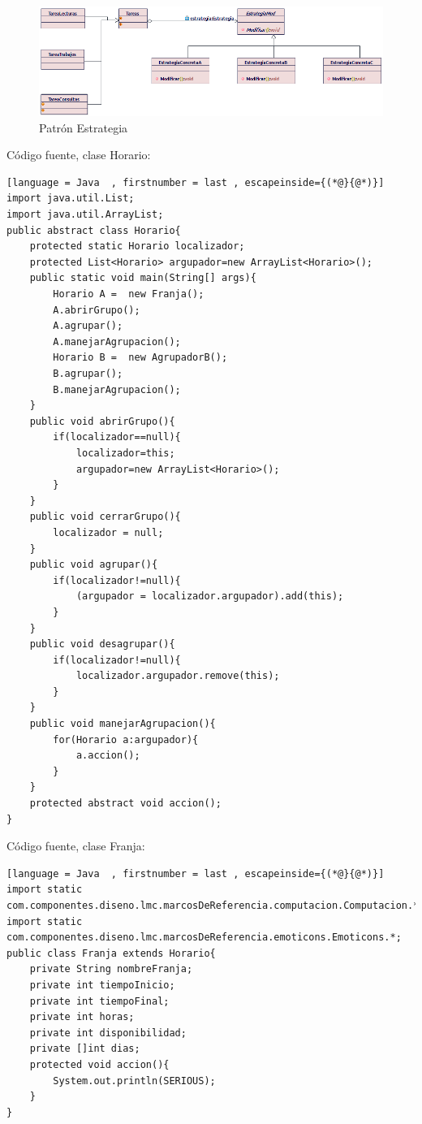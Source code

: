 \begin{figure}[H]
	\centering
	\includegraphics[width=1\linewidth]{diseno/patrones/imgs/Estrategia}
	\caption{Patrón Estrategia}
	\label{fig:gantt}
\end{figure}

Código fuente, clase Horario:

\begin{lstlisting}[language = Java  , firstnumber = last , escapeinside={(*@}{@*)}]
import java.util.List;
import java.util.ArrayList;
public abstract class Horario{
	protected static Horario localizador;
	protected List<Horario> argupador=new ArrayList<Horario>();
	public static void main(String[] args){
		Horario A =  new Franja();
		A.abrirGrupo();
		A.agrupar();
		A.manejarAgrupacion();
		Horario B =  new AgrupadorB();
		B.agrupar();
		B.manejarAgrupacion();
	}
	public void abrirGrupo(){
		if(localizador==null){
   			localizador=this;
   			argupador=new ArrayList<Horario>();
   		}
	}
	public void cerrarGrupo(){
		localizador = null;
	}
	public void agrupar(){
		if(localizador!=null){
   			(argupador = localizador.argupador).add(this);
		}
	}
	public void desagrupar(){
		if(localizador!=null){
   			localizador.argupador.remove(this);
		}
	}
	public void manejarAgrupacion(){
		for(Horario a:argupador){
 	    	a.accion();
		}
	}
	protected abstract void accion();
}
\end{lstlisting}

Código fuente, clase Franja:
\begin{lstlisting}[language = Java  , firstnumber = last , escapeinside={(*@}{@*)}]
import static com.componentes.diseno.lmc.marcosDeReferencia.computacion.Computacion.*;
import static com.componentes.diseno.lmc.marcosDeReferencia.emoticons.Emoticons.*;
public class Franja extends Horario{
	private String nombreFranja;
	private int tiempoInicio;
	private int tiempoFinal;
	private int horas;
	private int disponibilidad;
	private []int dias;
	protected void accion(){
		System.out.println(SERIOUS);
	}
}
\end{lstlisting}